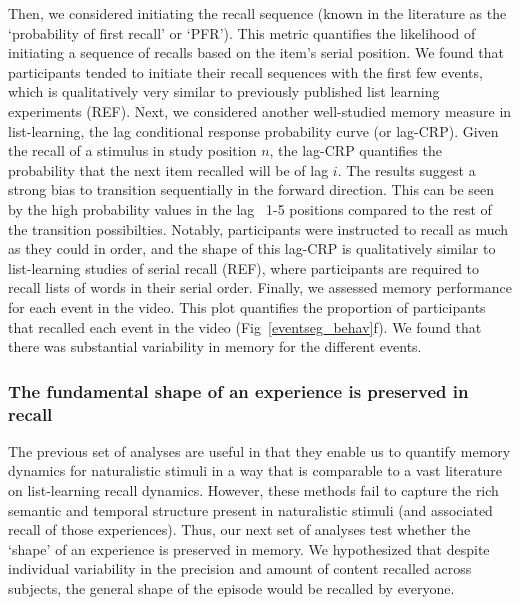 \documentclass{article}
\begin{document}
{Then, we considered initiating the recall sequence (known in the literature as the `probability of first recall' or `PFR'). This metric quantifies the likelihood of initiating a sequence of recalls based on the item's serial position. We found that participants tended to initiate their recall sequences with the first few events, which is qualitatively very similar to previously published list learning experiments (REF).  Next, we considered another well-studied memory measure in list-learning, the lag conditional response probability curve (or lag-CRP). Given the recall of a stimulus in study position $n$, the lag-CRP quantifies the probability that the next item recalled will be of lag $i$. The results suggest a strong bias to transition sequentially in the forward direction. This can be seen by the high probability values in the lag ~1-5 positions compared to the rest of the transition possibilties. Notably, participants were instructed to recall as much as they could in order, and the shape of this lag-CRP is qualitatively similar to list-learning studies of serial recall (REF), where participants are required to recall lists of words in their serial order. Finally, we assessed memory performance for each event in the video. This plot quantifies the proportion of participants that recalled each event in the video (Fig~\ref{eventseg_behav}f). We found that there was substantial variability in memory for the different events. %

\subsubsection{The fundamental shape of an experience is preserved in recall}
The previous set of analyses are useful in that they enable us to quantify memory dynamics for naturalistic stimuli in a way that is comparable to a vast literature on list-learning recall dynamics. However, these methods fail to capture the rich semantic and temporal structure present in naturalistic stimuli (and associated recall of those experiences). Thus, our next set of analyses test whether the `shape' of an experience is preserved in memory. We hypothesized that despite individual variability in the precision and amount of content recalled across subjects, the general shape of the episode would be recalled by everyone.

}
\end{document}
